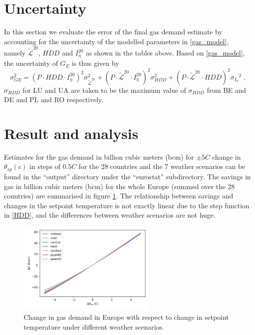 \documentclass[12pt]{article}
\def\be{\begin{equation}}
\def\ee{\end{equation}}
\begin{document}
\section{Uncertainty}
In this section we evaluate the error of the final gas demand estimate by accounting for the uncertainty of the modelled parameters in \eqref{gas_model}, namely $\tilde{\mathcal{L}}^{20}$, $HDD$ and $I_\eta^{20}$ as shown in the tables above. Based on \eqref{gas_model}, the uncertainty of $G_E$ is thus given by
\be 
\sigma_{GE}^2 =  \left(P \cdot HDD \cdot I_\eta^{20} \right)^2  {\sigma^2_{\tilde{\mathcal{L}}^{20}}} +
 \left(P \cdot \tilde{\mathcal{L}}^{20}\cdot I_\eta^{20} \right)^2  {\sigma^2_{HDD}}  +
 \left(P \cdot \tilde{\mathcal{L}}^{20} \cdot {HDD} \right)^2  {\sigma_{I_\eta}}^2 \; . 
\ee
$\sigma_{HDD}$ for LU and UA are taken to be the maximum value of $\sigma_{HDD}$ from BE and DE and PL and RO respectively.  

\section{Result and analysis}
Estimates for the gas demand in billion cubic meters (bcm) for $\pm 5 C$ change in $\theta_{sp} (c)$ in steps of $0.5C$ for the 28 countries and the 7 weather scenarios can be found in the ``output'' directory under the ``eurostat'' subdirectory. The savings in gas in billion cubic meters (bcm) for the whole Europe (summed over the 28 countries) are summarised in figure \ref{fig:delta_gas_demand_bcm_whole_europe}. The relationship between savings and changes in the setpoint temperature is not exactly linear due to the step function in \eqref{HDD}, and the differences between weather scenarios are not huge. 
\begin{figure}[h!]
\centering
	\includegraphics[width=0.6\textwidth]{delta_gas_demand_bcm_whole_europe}
	\caption{Change in gas demand in Europe with respect to change in setpoint temperature under different weather scenarios. } \label{fig:delta_gas_demand_bcm_whole_europe}
\end{figure}
\end{document}
